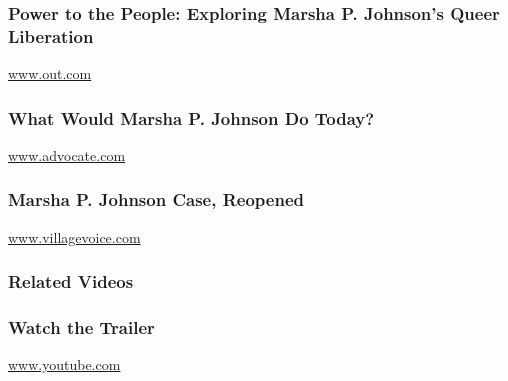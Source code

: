 \href{https://www.out.com/out-exclusives/2017/8/24/power-people-exploring-marsha-p-johnsons-queer-liberation}{}

\hypertarget{power-to-the-people-exploring-marsha-p-johnsons-queer-liberation}{%
\subsubsection{Power to the People: Exploring Marsha P. Johnson's Queer
Liberation}\label{power-to-the-people-exploring-marsha-p-johnsons-queer-liberation}}

\href{http://www.out.com}{www.out.com}

\href{https://www.advocate.com/film/2017/5/09/what-would-marsha-p-johnson-do-today}{}

\hypertarget{what-would-marsha-p-johnson-do-today}{%
\subsubsection{What Would Marsha P. Johnson Do
Today?}\label{what-would-marsha-p-johnson-do-today}}

\href{http://www.advocate.com}{www.advocate.com}

\href{https://www.villagevoice.com/2012/11/26/marsha-p-johnson-case-reopened/}{}

\hypertarget{marsha-p-johnson-case-reopened}{%
\subsubsection{Marsha P. Johnson Case,
Reopened}\label{marsha-p-johnson-case-reopened}}

\href{http://www.villagevoice.com}{www.villagevoice.com}

\hypertarget{related-videos}{%
\subsubsection{Related Videos}\label{related-videos}}

\href{https://www.youtube.com/watch?v=pADsuuPd79E}{}

\hypertarget{watch-the-trailer}{%
\subsubsection{Watch the Trailer}\label{watch-the-trailer}}

\href{http://www.youtube.com}{www.youtube.com}

\href{https://www.youtube.com/watch?v=C-pMeR2lnlo}{}

